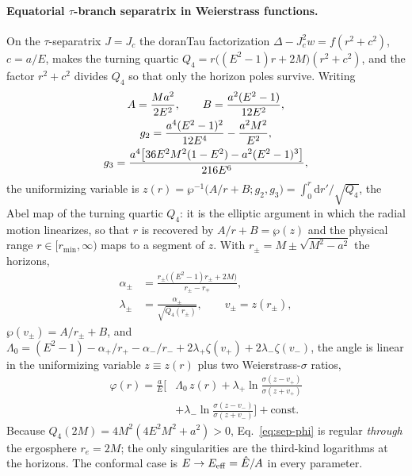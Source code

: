 \documentclass[
    aps, prd, twocolumn, superscriptaddress,
    showpacs, nofootinbib, floatfix
]{revtex4-2}
\newcommand{\Ehat}{\hat E}
\newcommand{\re}{r_{e}}
\newcommand{\Jc}{J_{c}}
\newcommand{\dd}{\mathrm{d}}
\begin{document}
\paragraph{Equatorial $\tau$-branch separatrix in Weierstrass functions.} On the
$\tau$-separatrix $J=\Jc$ the doranTau factorization $\Delta-\Jc^2 w=f(r^2+c^2)$,
$c=a/E$, makes the
turning quartic $Q_4=r\big((E^2-1)r+2M\big)(r^2+c^2)$, and the factor $r^2+c^2$
divides $Q_4$ so that only the horizon poles survive. Writing
\begin{gather}
    A=\frac{Ma^2}{2E^2},\qquad B=\frac{a^2(E^2-1)}{12E^2},\notag\\
    g_2=\frac{a^4(E^2-1)^2}{12E^4}-\frac{a^2M^2}{E^2},\notag\\
    g_3=\frac{a^4\big[36E^2M^2(1-E^2)-a^2(E^2-1)^3\big]}{216E^6},
    \label{eq:wp-invariants}
\end{gather}
the uniformizing variable is $z(r)=\wp^{-1}\!\big(A/r+B;g_2,g_3\big)
=\int_0^r\dd r'/\sqrt{Q_4}$, the Abel map of the turning quartic $Q_4$: it is the
elliptic argument in which the radial motion linearizes, so that $r$ is recovered
by $A/r+B=\wp(z)$ and the physical range $r\in[r_{\min},\infty)$ maps to a
segment of $z$. With $r_\pm=M\pm\sqrt{M^2-a^2}$ the horizons,
\begin{equation}
\begin{aligned}
    \alpha_\pm&=\frac{r_\pm\big((E^2-1)r_\pm+2M\big)}{r_\pm-r_\mp},\\
    \lambda_\pm&=\frac{\alpha_\pm}{\sqrt{Q_4(r_\pm)}},\qquad v_\pm=z(r_\pm),
\end{aligned}
\end{equation}
$\wp(v_\pm)=A/r_\pm+B$, and
$\Lambda_0=(E^2-1)-\alpha_+/r_+-\alpha_-/r_-+2\lambda_+\zeta(v_+)+2\lambda_-\zeta(v_-)$,
the angle is linear in the uniformizing variable $z\equiv z(r)$ plus two
Weierstrass-$\sigma$ ratios,
\begin{equation}
\begin{split}
    \varphi(r)=\frac{a}{E}\Big[&\Lambda_0\,z(r)
      +\lambda_+\ln\frac{\sigma(z-v_+)}{\sigma(z+v_+)}\\
      &+\lambda_-\ln\frac{\sigma(z-v_-)}{\sigma(z+v_-)}\Big]+\text{const}.
\end{split}
    \label{eq:sep-phi}
\end{equation}
Because $Q_4(2M)=4M^2(4E^2M^2+a^2)>0$, Eq.~\eqref{eq:sep-phi} is regular
\emph{through} the ergosphere $\re=2M$; the only singularities are the
third-kind logarithms at the horizons. The conformal case is
$E\to E_{\rm eff}=\Ehat/A$ in every parameter.
\end{document}
